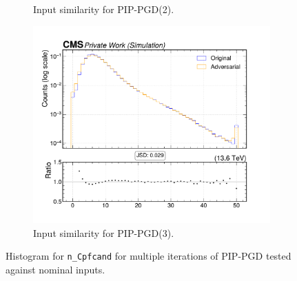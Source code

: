 \begin{figure}[htbp]
\begin{subfigure}[t]{0.32\textwidth}
    \caption*{Input similarity for PIP-PGD(2).}
  \end{subfigure}\hfill
  \begin{subfigure}[t]{0.32\textwidth}
    \includegraphics[width=\linewidth]{media/output/features/compare/combined_it_3/cmp_global_features_n_Cpfcand.pdf}
    \caption*{Input similarity for PIP-PGD(3).}
  \end{subfigure}

  \caption*{Histogram for \texttt{n\_Cpfcand} for multiple iterations of PIP-PGD tested against nominal inputs.}
  \label{fig:combined_input_n_Cpfcand}
\end{figure}

